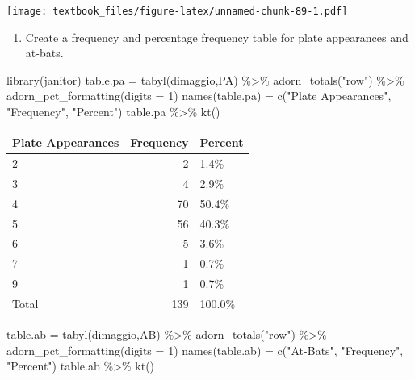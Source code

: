 \documentclass[
  11pt,
]{book}
\newenvironment{Shaded}{\begin{snugshade}}{\end{snugshade}}
\newcommand{\AttributeTok}[1]{\textcolor[rgb]{0.77,0.63,0.00}{#1}}
\newcommand{\DecValTok}[1]{\textcolor[rgb]{0.00,0.00,0.81}{#1}}
\newcommand{\FunctionTok}[1]{\textcolor[rgb]{0.00,0.00,0.00}{#1}}
\newcommand{\NormalTok}[1]{#1}
\newcommand{\OtherTok}[1]{\textcolor[rgb]{0.56,0.35,0.01}{#1}}
\newcommand{\SpecialCharTok}[1]{\textcolor[rgb]{0.00,0.00,0.00}{#1}}
\newcommand{\StringTok}[1]{\textcolor[rgb]{0.31,0.60,0.02}{#1}}
\providecommand{\tightlist}{%
  \setlength{\itemsep}{0pt}\setlength{\parskip}{0pt}}
\theoremstyle{definition}
\theoremstyle{definition}
\theoremstyle{definition}
\theoremstyle{definition}
\theoremstyle{remark}
\begin{document}
\texttt{[image: textbook\_files/figure-latex/unnamed-chunk-89-1.pdf]}

\vfill
\newpage

\begin{enumerate}
\def\labelenumi{(\alph{enumi})}
\setcounter{enumi}{1}
\tightlist
\item
  Create a frequency and percentage frequency table for plate appearances and at-bats.
\end{enumerate}

\begin{Shaded}
\begin{Highlighting}[]
\FunctionTok{library}\NormalTok{(janitor)}
\NormalTok{table.pa }\OtherTok{=} \FunctionTok{tabyl}\NormalTok{(dimaggio,PA) }\SpecialCharTok{\%\textgreater{}\%} 
  \FunctionTok{adorn\_totals}\NormalTok{(}\StringTok{"row"}\NormalTok{) }\SpecialCharTok{\%\textgreater{}\%}
  \FunctionTok{adorn\_pct\_formatting}\NormalTok{(}\AttributeTok{digits =} \DecValTok{1}\NormalTok{)}
\FunctionTok{names}\NormalTok{(table.pa) }\OtherTok{=} \FunctionTok{c}\NormalTok{(}\StringTok{"Plate Appearances"}\NormalTok{, }\StringTok{"Frequency"}\NormalTok{, }\StringTok{"Percent"}\NormalTok{)}
\NormalTok{table.pa }\SpecialCharTok{\%\textgreater{}\%} \FunctionTok{kt}\NormalTok{()}
\end{Highlighting}
\end{Shaded}

\begin{table}[H]
\centering
\begin{tabular}{lrl}
\toprule
Plate Appearances & Frequency & Percent\\
\midrule
2 & 2 & 1.4\%\\
3 & 4 & 2.9\%\\
4 & 70 & 50.4\%\\
5 & 56 & 40.3\%\\
6 & 5 & 3.6\%\\
7 & 1 & 0.7\%\\
9 & 1 & 0.7\%\\
Total & 139 & 100.0\%\\
\bottomrule
\end{tabular}
\end{table}

\begin{Shaded}
\begin{Highlighting}[]
\NormalTok{table.ab }\OtherTok{=} \FunctionTok{tabyl}\NormalTok{(dimaggio,AB) }\SpecialCharTok{\%\textgreater{}\%} 
  \FunctionTok{adorn\_totals}\NormalTok{(}\StringTok{"row"}\NormalTok{) }\SpecialCharTok{\%\textgreater{}\%}
  \FunctionTok{adorn\_pct\_formatting}\NormalTok{(}\AttributeTok{digits =} \DecValTok{1}\NormalTok{)}
\FunctionTok{names}\NormalTok{(table.ab) }\OtherTok{=} \FunctionTok{c}\NormalTok{(}\StringTok{"At{-}Bats"}\NormalTok{, }\StringTok{"Frequency"}\NormalTok{, }\StringTok{"Percent"}\NormalTok{)}
\NormalTok{table.ab }\SpecialCharTok{\%\textgreater{}\%} \FunctionTok{kt}\NormalTok{()}
\end{Highlighting}
\end{Shaded}
\end{document}
